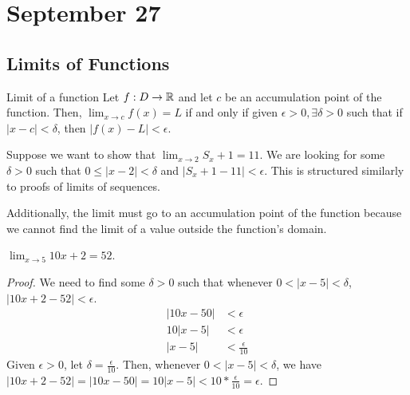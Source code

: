 \section{September 27}

\subsection{Limits of Functions}
\begin{definition}{Limit of a function}{}
    Let $f:D \to \mathbb{R}$ and let $c$ be an accumulation point of the function. Then, $\lim_{x \to c} f(x) = L$ if and only if given $\epsilon > 0, \exists \delta > 0$ such that if $|x - c| < \delta$, then $|f(x) - L| < \epsilon$.
\end{definition}
\begin{note}
    Suppose we want to show that $\lim_{x \to 2} S_x + 1 = 11$. We are looking for some $\delta > 0$ such that $0 \leq |x  - 2| < \delta$ and $|S_x + 1 - 11| < \epsilon$. This is structured similarly to proofs of limits of sequences.

    Additionally, the limit must go to an accumulation point of the function because we cannot find the limit of a value outside the function's domain.
\end{note}

\begin{theorem}{}{}
    $\lim_{x \to 5} 10x + 2 = 52$.
\end{theorem}
\begin{proof}
    We need to find some $\delta > 0$ such that whenever $0 < |x - 5| < \delta$, $|10x + 2 - 52| < \epsilon$.
    \begin{align*}
        |10x - 50| &< \epsilon \\
        10|x - 5| &< \epsilon \\
        |x - 5| &< \frac{\epsilon}{10}
    \end{align*}
    Given $\epsilon > 0$, let $\delta = \frac{\epsilon}{10}$. Then, whenever $0 < |x - 5| < \delta$, we have $|10x + 2 - 52| = |10x - 50| = 10|x - 5| < 10 * \frac{\epsilon}{10} = \epsilon$.
\end{proof}

